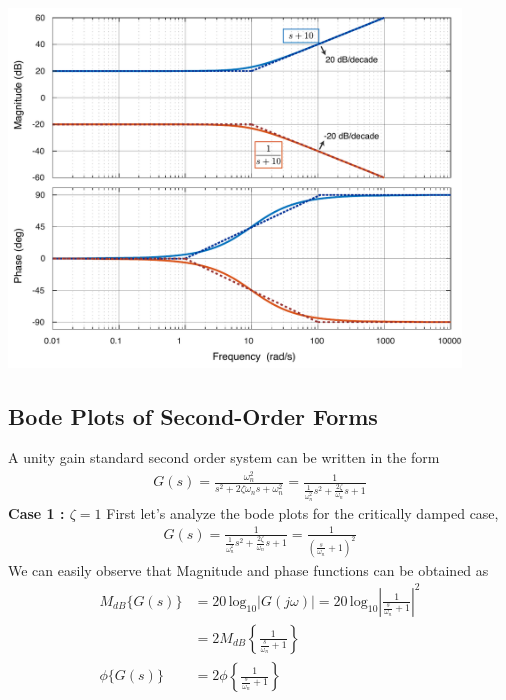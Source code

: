 \documentclass[twoside]{article}
\begin{document}
  \begin{minipage}[h]{1\linewidth}
    \begin{center}
      \includegraphics[width=0.9\textwidth]{spa}
    \end{center}
  \end{minipage}

\vspace{6 pt}

\subsection*{Bode Plots of Second-Order Forms}

A unity gain standard second order system can be written in the form
%
\begin{align*}
	G(s) = \frac{\omega_n^2}{s^2 + 2 \zeta \omega_n s + \omega_n^2} 
		= \frac{1}{\frac{1}{\omega_n^2} s^2 + \frac{2 \zeta}{\omega_n} s + 1} 
\end{align*}
%
\textbf{Case 1 : $\zeta = 1$} First let's analyze the bode plots for the critically damped case, 
%
\begin{align*}
	G(s) =  \frac{1}{\frac{1}{\omega_n^2} s^2 + \frac{2 \zeta}{\omega_n} s + 1} 
		= \frac{1}{(\frac{s}{\omega_n} + 1)^2}
\end{align*}
%
We can easily observe that 
%
Magnitude and phase functions can be obtained as
\begin{align*}
  M_{dB} \lbrace G(s) \rbrace &= 20 \, \mathrm{log}_{10} | G( j \omega) | =   20 \, \mathrm{log}_{10} \left| \frac{1}{\frac{s}{\omega_n} + 1} \right|^2
  \\
  	&= 2 M_{dB} \left\lbrace \frac{1}{\frac{s}{\omega_n} + 1}  \right\rbrace
	\\  
  \phi \lbrace G(s) \rbrace &= 2 \phi \left\lbrace \frac{1}{\frac{s}{\omega_n} + 1}  \right\rbrace
\end{align*}
\end{document}
